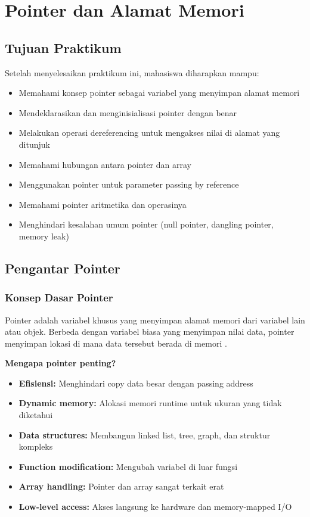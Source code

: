 \documentclass[../main.tex]{subfiles}
\begin{document}
\chapter{Pointer dan Alamat Memori}

\section*{Tujuan Praktikum}
Setelah menyelesaikan praktikum ini, mahasiswa diharapkan mampu:
\begin{itemize}
  \item Memahami konsep pointer sebagai variabel yang menyimpan alamat memori
  \item Mendeklarasikan dan menginisialisasi pointer dengan benar
  \item Melakukan operasi dereferencing untuk mengakses nilai di alamat yang ditunjuk
  \item Memahami hubungan antara pointer dan array
  \item Menggunakan pointer untuk parameter passing by reference
  \item Memahami pointer aritmetika dan operasinya
  \item Menghindari kesalahan umum pointer (null pointer, dangling pointer, memory leak)
\end{itemize}

\section{Pengantar Pointer}

\subsection{Konsep Dasar Pointer}
Pointer adalah variabel khusus yang menyimpan alamat memori dari variabel lain atau objek. Berbeda dengan variabel biasa yang menyimpan nilai data, pointer menyimpan lokasi di mana data tersebut berada di memori \parencite{gnu-c-manual,cpp-reference,tutorialspoint-c-pointers,geeksforgeeks-pointers}.

\textbf{Mengapa pointer penting?}
\begin{itemize}
  \item \textbf{Efisiensi:} Menghindari copy data besar dengan passing address
  \item \textbf{Dynamic memory:} Alokasi memori runtime untuk ukuran yang tidak diketahui
  \item \textbf{Data structures:} Membangun linked list, tree, graph, dan struktur kompleks
  \item \textbf{Function modification:} Mengubah variabel di luar fungsi
  \item \textbf{Array handling:} Pointer dan array sangat terkait erat
  \item \textbf{Low-level access:} Akses langsung ke hardware dan memory-mapped I/O
\end{itemize}
\end{document}

